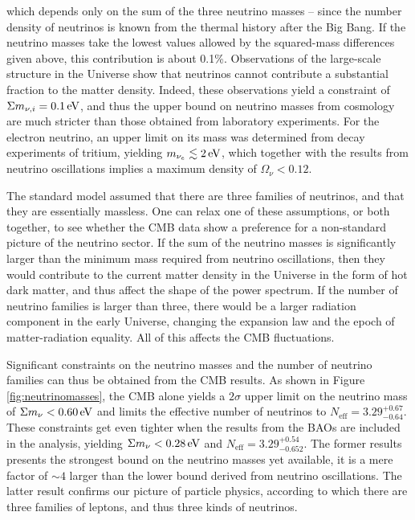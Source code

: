\documentclass[a4paper,11pt]{article}
\begin{document}
{\noindent}which depends only on the sum of the three neutrino masses -- since the number density of neutrinos is known from the thermal history after the Big Bang. If the neutrino masses take the lowest values allowed by the squared-mass differences given above, this contribution is about 0.1\%. Observations of the large-scale structure in the Universe show that neutrinos cannot contribute a substantial fraction to the matter density. Indeed, these observations yield a constraint of $\Sigma m_{\nu,i}=0.1\,{\rm eV}$, and thus the upper bound on neutrino masses from cosmology are much stricter than those obtained from laboratory experiments. For the electron neutrino, an upper limit on its mass was determined from decay experiments of tritium, yielding $m_{\nu_e}\lesssim2\,{\rm eV}$, which together with the results from neutrino oscillations implies a maximum density of $\Omega_\nu<0.12$.


{\noindent}The standard model assumed that there are three families of neutrinos, and that they are essentially massless. One can relax one of these assumptions, or both together, to see whether the CMB data show a preference for a non-standard picture of the neutrino sector. If the sum of the neutrino masses is significantly larger than the minimum mass required from neutrino oscillations, then they would contribute to the current matter density in the Universe in the form of hot dark matter, and thus affect the shape of the power spectrum. If the number of neutrino families is larger than three, there would be a larger radiation component in the early Universe, changing the expansion law and the epoch of matter-radiation equality. All of this affects the CMB fluctuations.

{\noindent}Significant constraints on the neutrino masses and the number of neutrino families can thus be obtained from the CMB results. As shown in Figure \ref{fig:neutrinomasses}, the CMB alone yields a $2\sigma$ upper limit on the neutrino mass of $\Sigma m_\nu<0.60\,{\rm eV}$ and limits the effective number of neutrinos to $N_\mathrm{eff}=3.29^{+0.67}_{-0.64}$. These constraints get even tighter when the results from the BAOs are included in the analysis, yielding $\Sigma m_\nu<0.28\,{\rm eV}$ and $N_\mathrm{eff}=3.29^{+0.54}_{-0.652}$. The former results presents the strongest bound on the neutrino masses yet available, it is a mere factor of $\sim4$ larger than the lower bound derived from neutrino oscillations. The latter result confirms our picture of particle physics, according to which there are three families of leptons, and thus three kinds of neutrinos. 
\end{document}

